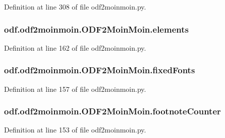 Definition at line 308 of file odf2moinmoin.\+py.

\hypertarget{classodf_1_1odf2moinmoin_1_1ODF2MoinMoin_a0695b2790b9d410f250a55d2ab06114d}{
\subsubsection[{elements}]{\setlength{\rightskip}{0pt plus 5cm}odf.\+odf2moinmoin.\+O\+D\+F2\+Moin\+Moin.\+elements}}\label{classodf_1_1odf2moinmoin_1_1ODF2MoinMoin_a0695b2790b9d410f250a55d2ab06114d}


Definition at line 162 of file odf2moinmoin.\+py.

\hypertarget{classodf_1_1odf2moinmoin_1_1ODF2MoinMoin_abe115f797787cac002a65db7d292bca2}{
\subsubsection[{fixed\+Fonts}]{\setlength{\rightskip}{0pt plus 5cm}odf.\+odf2moinmoin.\+O\+D\+F2\+Moin\+Moin.\+fixed\+Fonts}}\label{classodf_1_1odf2moinmoin_1_1ODF2MoinMoin_abe115f797787cac002a65db7d292bca2}


Definition at line 157 of file odf2moinmoin.\+py.

\hypertarget{classodf_1_1odf2moinmoin_1_1ODF2MoinMoin_abddaf84069aef2fd567406d50d44523c}{
\subsubsection[{footnote\+Counter}]{\setlength{\rightskip}{0pt plus 5cm}odf.\+odf2moinmoin.\+O\+D\+F2\+Moin\+Moin.\+footnote\+Counter}}\label{classodf_1_1odf2moinmoin_1_1ODF2MoinMoin_abddaf84069aef2fd567406d50d44523c}


Definition at line 153 of file odf2moinmoin.\+py.

